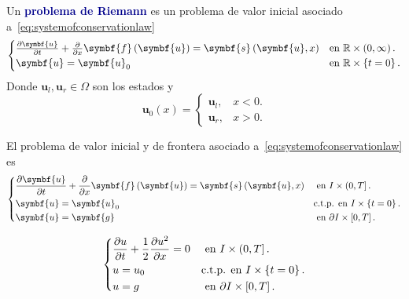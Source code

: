 \begin{definition}
	Un \textcolor{DarkBlue}{\bfseries problema de Riemann}
	 es un problema de valor inicial
	asociado a~\eqref{eq:systemofconservationlaw}
	\begin{equation}\label{eq:cauchysystemofconservationlaw}
		\begin{cases}
			\diffp{\symbf{u}}{t}+
			\diffp{}{x}
			\symbf{f}\left(\symbf{u}\right)=
			\symbf{s}\left(\symbf{u},x\right) &
			\text{en }\mathbb{R}\times\left(0,\infty\right). \\
			\symbf{u}=\symbf{u}_{0}           &
			\text{en }\mathbb{R}\times\left\{t=0\right\}.
		\end{cases}
	\end{equation}
	Donde $\symbf{u}_{l},\symbf{u}_{r}\in\Omega$ son los estados y
	\begin{equation*}
		\symbf{u}_{0}\left(x\right)=
		\begin{cases}
			\symbf{u}_{l}, & x<0. \\
			\symbf{u}_{r}, & x>0.
		\end{cases}
	\end{equation*}
\end{definition}

\begin{definition}
	El problema de valor inicial y de frontera asociado
	a~\eqref{eq:systemofconservationlaw} es
	\begin{equation}
		\begin{dcases}
			\diffp{\symbf{u}}{t}+
			\diffp{}{x}\symbf{f}\left(\symbf{u}\right)=
			\symbf{s}\left(\symbf{u},x\right) &
			\text{ en }I\times\left(0,T\right].         \\
			\symbf{u}=\symbf{u}_{0}           &
			\text{c.t.p. en }I\times\left\{t=0\right\}. \\
			\symbf{u}=\symbf{g}               &
			\text{ en }\partial I\times\left[0,T\right].
		\end{dcases}
	\end{equation}
\end{definition}

\begin{example}
	\begin{equation}
		\begin{dcases}
			\diffp{u}{t}+
			\frac{1}{2}\diffp{u^{2}}{x}=0 &
			\text{ en }I\times\left(0,T\right].         \\
			u=u_{0}                       &
			\text{c.t.p. en }I\times\left\{t=0\right\}. \\
			u=g                           &
			\text{ en }\partial I\times\left[0,T\right].
		\end{dcases}
	\end{equation}
\end{example}

